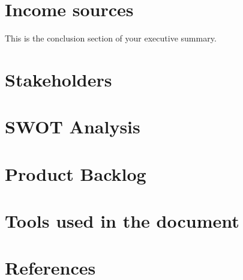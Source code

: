 \documentclass{article}
\begin{document}
\newpage
\section{Income sources}
This is the conclusion section of your executive summary.

\newpage
\section{Stakeholders}

\newpage
\section{SWOT Analysis}

\newpage
\section{Product Backlog}

\newpage

\section{Tools used in the document}

\newpage

\section{References}

\newpage
\end{document}
